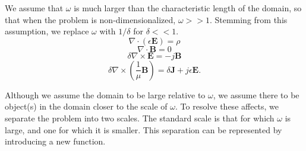 \documentclass{article}
\theoremstyle{plain}
\begin{document}
We assume that $\omega$ is much larger than the characteristic length of the domain, so that when the problem is non-dimensionalized, $\omega >> 1$. Stemming from this assumption, we replace $\omega$ with $1/\delta$ for $\delta<<1$.
\begin{equation}\label{eq:max1a}
	\nabla\cdot\left(\epsilon\mathbf{E}\right) = \rho
\end{equation}
\begin{equation}\label{eq:max2a}
	\nabla\cdot\mathbf{B} = 0
\end{equation}
\begin{equation}\label{eq:max3a}
	\delta\nabla\times\mathbf{E} = -j\mathbf{B}
\end{equation}
\begin{equation}\label{eq:max4a}
	\delta\nabla\times\left(\frac{1}{\mu}\mathbf{B}\right) = \delta\mathbf{J} + j\epsilon\mathbf{E}.
\end{equation}

Although we assume the domain to be large relative to $\omega$, we assume there to be object(s) in the domain closer to the scale of $\omega$. To resolve these affects, we separate the problem into two scales. The standard scale is that for which $\omega$ is large, and one for which it is smaller. This separation can be represented by introducing a new function.
\end{document}
